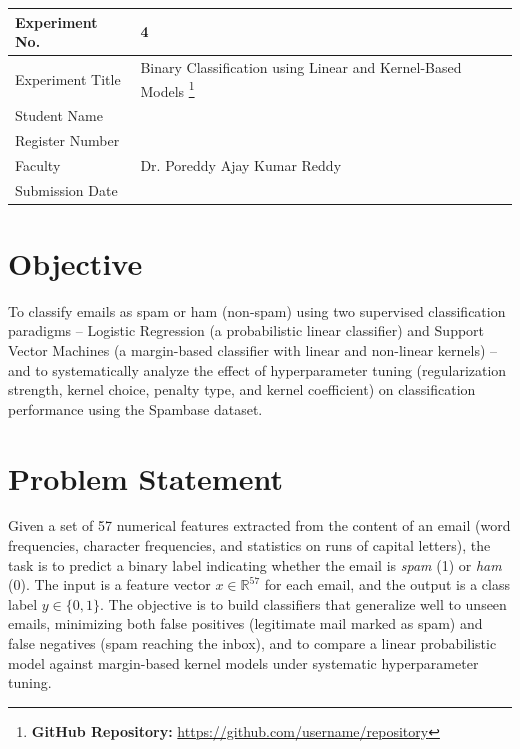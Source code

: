 \documentclass[12pt,a4paper]{article}
\begin{document}
\begin{tabular}{|p{4cm}|p{11cm}|}
\hline
Experiment No. & 4 \\ \hline
Experiment Title & Binary Classification using Linear and Kernel-Based Models
\footnote{\textbf{GitHub Repository: }\url{https://github.com/username/repository}}\\ \hline
Student Name & \\ \hline
Register Number & \\ \hline
Faculty & Dr. Poreddy Ajay Kumar Reddy \\ \hline
Submission Date & \\ \hline
\end{tabular}

\section{Objective}
To classify emails as spam or ham (non-spam) using two supervised classification
paradigms -- Logistic Regression (a probabilistic linear classifier) and Support
Vector Machines (a margin-based classifier with linear and non-linear kernels) --
and to systematically analyze the effect of hyperparameter tuning (regularization
strength, kernel choice, penalty type, and kernel coefficient) on classification
performance using the Spambase dataset.

\section{Problem Statement}
Given a set of 57 numerical features extracted from the content of an email
(word frequencies, character frequencies, and statistics on runs of capital
letters), the task is to predict a binary label indicating whether the email is
\emph{spam} (1) or \emph{ham} (0). The input is a feature vector
$x \in \mathbb{R}^{57}$ for each email, and the output is a class label
$y \in \{0,1\}$. The objective is to build classifiers that generalize well to
unseen emails, minimizing both false positives (legitimate mail marked as spam)
and false negatives (spam reaching the inbox), and to compare a linear
probabilistic model against margin-based kernel models under systematic
hyperparameter tuning.
\end{document}

